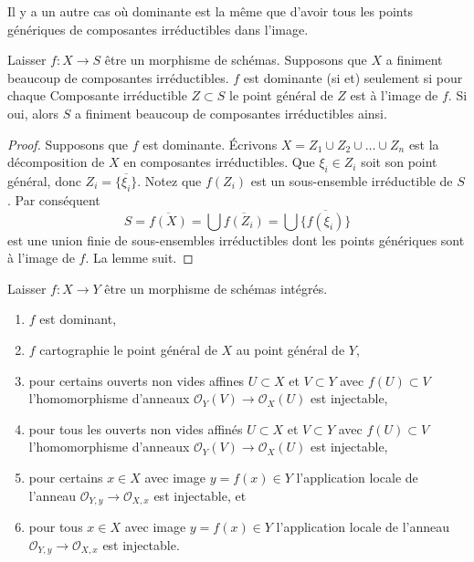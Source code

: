 \noindent
Il y a un autre cas où dominante est la même que d'avoir tous les points génériques de composantes irréductibles dans l'image.

\begin{lemma}

\label{lemma-dominant-finite-number-irreducible-components}

Laisser $f : X \to S$ être un morphisme de schémas. Supposons que $X$ a finiment beaucoup de composantes irréductibles. $f$ est dominante (si et) seulement si pour chaque Composante irréductible $Z \subset S$ le point général de $Z$ est à l'image de $f$. Si oui, alors $S$ a finiment beaucoup de composantes irréductibles ainsi.

\end{lemma}

\begin{proof}
Supposons que $f$ est dominante. Écrivons $X = Z_1 \cup Z_2 \cup \ldots \cup Z_n$ est la décomposition de $X$ en composantes irréductibles. Que $\xi_i \in Z_i$ soit son point général, donc $Z_i = \overline{\{\xi_i\}}$. Notez que $f(Z_i)$ est un sous-ensemble irréductible de $S$. Par conséquent $$
S = \overline{f(X)} = \bigcup \overline{f(Z_i)} =
\bigcup \overline{\{f(\xi_i)\}}
$$ est une union finie de sous-ensembles irréductibles dont les points génériques sont à l'image de $f$. La lemme suit.
\end{proof}

\begin{lemma}

\label{lemma-dominant-between-integral}

Laisser $f : X \to Y$ être un morphisme de schémas intégrés.

\begin{enumerate}

\item  $f$ est dominant,
\item  $f$ cartographie le point général de $X$ au point général de $Y$,
\item pour certains ouverts non vides affines $U \subset X$ et $V \subset Y$
avec $f(U) \subset V$ l'homomorphisme d'anneaux $\mathcal{O}_Y(V) \to \mathcal{O}_X(U)$
est injectable,
\item pour tous les ouverts non vides affinés $U \subset X$ et $V \subset Y$
avec $f(U) \subset V$ l'homomorphisme d'anneaux $\mathcal{O}_Y(V) \to \mathcal{O}_X(U)$
est injectable,
\item pour certains $x \in X$ avec image $y = f(x) \in Y$ l'application locale de l'anneau $\mathcal{O}_{Y, y} \to \mathcal{O}_{X, x}$ est injectable, et
\item pour tous $x \in X$ avec image $y = f(x) \in Y$ l'application locale de l'anneau $\mathcal{O}_{Y, y} \to \mathcal{O}_{X, x}$ est injectable.

\end{enumerate}

\end{lemma}


